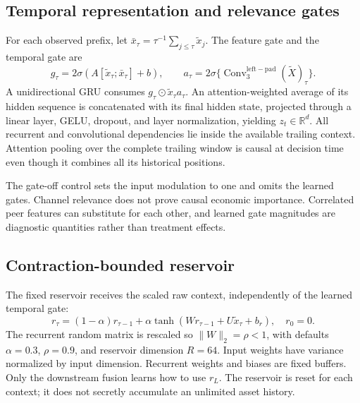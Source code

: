 \documentclass[11pt,a4paper]{article}
\newcommand{\R}{\mathbb R}
\begin{document}
\subsection{Temporal representation and relevance gates}

For each observed prefix, let $\bar x_{\tau}=\tau^{-1}\sum_{j\le\tau}\widetilde x_j$. The feature gate and the temporal gate are
\begin{equation}
g_{\tau}=2\sigma(A[\widetilde x_\tau;\bar x_\tau]+b),\qquad
a_{\tau}=2\sigma\{\operatorname{Conv}^{\mathrm{left-pad}}_3(\widetilde X)_\tau\}.
\end{equation}
A unidirectional GRU consumes $g_\tau\odot\widetilde x_\tau a_\tau$. An attention-weighted average of its hidden sequence is concatenated with its final hidden state, projected through a linear layer, GELU, dropout, and layer normalization, yielding $z_t\in\R^d$. All recurrent and convolutional dependencies lie inside the available trailing context. Attention pooling over the complete trailing window is causal at decision time even though it combines all its historical positions.

The gate-off control sets the input modulation to one and omits the learned gates. Channel relevance does not prove causal economic importance. Correlated peer features can substitute for each other, and learned gate magnitudes are diagnostic quantities rather than treatment effects.

\subsection{Contraction-bounded reservoir}

The fixed reservoir receives the scaled raw context, independently of the learned temporal gate:
\begin{equation}
r_\tau=(1-\alpha)r_{\tau-1}+\alpha\tanh(Wr_{\tau-1}+U\widetilde x_\tau+b_r),\quad r_0=0.
\end{equation}
The recurrent random matrix is rescaled so $\|W\|_2=\rho<1$, with defaults $\alpha=0.3$, $\rho=0.9$, and reservoir dimension $R=64$. Input weights have variance normalized by input dimension. Recurrent weights and biases are fixed buffers. Only the downstream fusion learns how to use $r_L$. The reservoir is reset for each context; it does not secretly accumulate an unlimited asset history.
\end{document}
